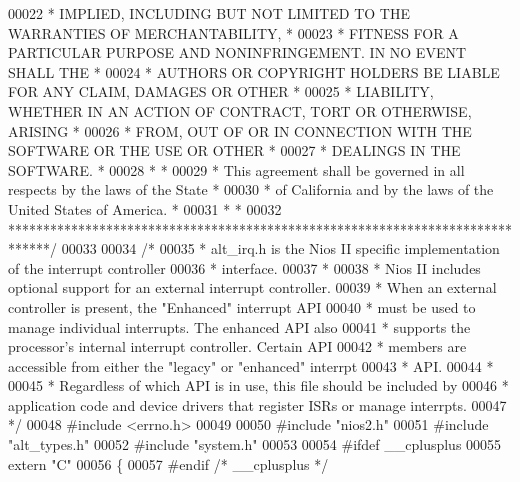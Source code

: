 \begin{DoxyCode}
00022 \textcolor{comment}{* IMPLIED, INCLUDING BUT NOT LIMITED TO THE WARRANTIES OF MERCHANTABILITY,    *}
00023 \textcolor{comment}{* FITNESS FOR A PARTICULAR PURPOSE AND NONINFRINGEMENT. IN NO EVENT SHALL THE *}
00024 \textcolor{comment}{* AUTHORS OR COPYRIGHT HOLDERS BE LIABLE FOR ANY CLAIM, DAMAGES OR OTHER      *}
00025 \textcolor{comment}{* LIABILITY, WHETHER IN AN ACTION OF CONTRACT, TORT OR OTHERWISE, ARISING     *}
00026 \textcolor{comment}{* FROM, OUT OF OR IN CONNECTION WITH THE SOFTWARE OR THE USE OR OTHER         *}
00027 \textcolor{comment}{* DEALINGS IN THE SOFTWARE.                                                   *}
00028 \textcolor{comment}{*                                                                             *}
00029 \textcolor{comment}{* This agreement shall be governed in all respects by the laws of the State   *}
00030 \textcolor{comment}{* of California and by the laws of the United States of America.              *}
00031 \textcolor{comment}{*                                                                             *}
00032 \textcolor{comment}{******************************************************************************/}
00033 
00034 \textcolor{comment}{/*}
00035 \textcolor{comment}{ * alt\_irq.h is the Nios II specific implementation of the interrupt controller }
00036 \textcolor{comment}{ * interface.}
00037 \textcolor{comment}{ *}
00038 \textcolor{comment}{ * Nios II includes optional support for an external interrupt controller. }
00039 \textcolor{comment}{ * When an external controller is present, the "Enhanced" interrupt API}
00040 \textcolor{comment}{ * must be used to manage individual interrupts. The enhanced API also}
00041 \textcolor{comment}{ * supports the processor's internal interrupt controller. Certain API}
00042 \textcolor{comment}{ * members are accessible from either the "legacy" or "enhanced" interrpt}
00043 \textcolor{comment}{ * API. }
00044 \textcolor{comment}{ *}
00045 \textcolor{comment}{ * Regardless of which API is in use, this file should be included by}
00046 \textcolor{comment}{ * application code and device drivers that register ISRs or manage interrpts.}
00047 \textcolor{comment}{ */}
00048 \textcolor{preprocessor}{#include <errno.h>}
00049 
00050 \textcolor{preprocessor}{#include "nios2.h"}
00051 \textcolor{preprocessor}{#include "alt_types.h"}
00052 \textcolor{preprocessor}{#include "system.h"}
00053 
00054 \textcolor{preprocessor}{#ifdef \_\_cplusplus}
00055 \textcolor{keyword}{extern} \textcolor{stringliteral}{"C"}
00056 \{
00057 \textcolor{preprocessor}{#endif }\textcolor{comment}{/* \_\_cplusplus */}\textcolor{preprocessor}{}

\end{DoxyCode}
